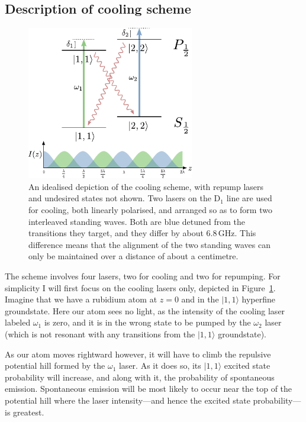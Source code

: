 \subsection{Description of cooling scheme}

\begin{figure}
\begin{center}
\includegraphics[width=0.65\textwidth]{figures/unsorted/cooling_simplified.pdf}
\caption{\label{fig:cooling_simplified}An idealised depiction of the cooling scheme, with repump lasers and undesired states not shown. Two lasers on the D$_1$ line are used for cooling, both linearly polarised, and arranged so as to form two interleaved standing waves. Both are blue detuned from the transitions they target, and they differ by about $6.8\,$GHz. This difference means that the alignment of the two standing waves can only be maintained over a distance of about a centimetre.}
\end{center}
\end{figure}

The scheme involves four lasers, two for cooling and two for repumping. For simplicity I will first focus on the cooling lasers only, depicted in Figure~\ref{fig:cooling_simplified}. Imagine that we have a rubidium atom at $z=0$ and in the $|1,1\rangle$ hyperfine groundstate. Here our atom sees no light, as the intensity of the cooling laser labeled $\omega_1$ is zero, and it is in the wrong state to be pumped by the $\omega_2$ laser (which is not resonant with any transitions from the $|1,1\rangle$ groundstate).

As our atom moves rightward however, it will have to climb the repulsive potential hill formed by the $\omega_1$ laser. As it does so, its $|1,1\rangle$ excited state probability will increase, and along with it, the probability of spontaneous emission. Spontaneous emission will be most likely to occur near the top of the potential hill where the laser intensity---and hence the excited state probability---is greatest.

